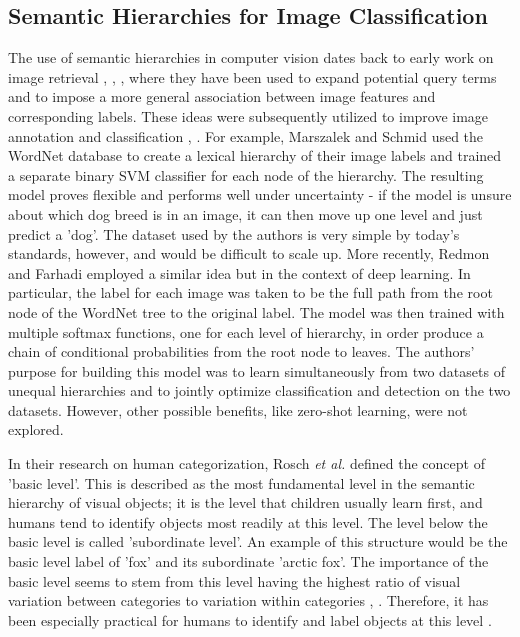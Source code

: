 \documentclass[12pt]{report}
\begin{document}
\subsection{Semantic Hierarchies for Image Classification}
The use of semantic hierarchies in computer vision dates back to early work on image retrieval \cite{Aslandogan1997}, \cite{Zhao2001}, \cite{Grosky2002} \cite{Barnard2001}, where they have been used to expand potential query terms and to impose a more general association between image features and corresponding labels. These ideas were subsequently utilized to improve image annotation and classification \cite{Srikanth2005}, \cite{Marszaek2007} \cite{Griffin2013}. For example, Marszalek and Schmid \cite{Marszaek2007} used the WordNet database \cite{Miller1995} to create a lexical hierarchy of their image labels and trained a separate binary SVM classifier \cite{Scholkopf2002} for each node of the hierarchy. The resulting model proves flexible and performs well under uncertainty - if the model is unsure about which dog breed is in an image, it can then move up one level and just predict a 'dog'. The dataset used by the authors is very simple by today's standards, however, and would be difficult to scale up. More recently, Redmon and Farhadi \cite{Redmon} employed a similar idea but in the context of deep learning. In particular, the label for each image was taken to be the full path from the root node of the WordNet tree to the original label. The model was then trained with multiple softmax functions, one for each level of hierarchy, in order produce a chain of conditional probabilities from the root node to leaves. The authors' purpose for building this model was to learn simultaneously from two datasets of unequal hierarchies and to jointly optimize classification and detection on the two datasets. However, other possible benefits, like zero-shot learning, were not explored. 

In their research on human categorization, Rosch \textit{et al.} \cite{Rosch1976} defined the concept of 'basic level'. This is described as the most fundamental level in the semantic hierarchy of visual objects; it is the level that children usually learn first, and humans tend to identify objects most readily at this level. The level below the basic level is called 'subordinate level'. An example of this structure would be the basic level label of 'fox' and its subordinate 'arctic fox'. The importance of the basic level seems to stem from this level having the highest ratio of visual variation between categories to variation within categories \cite{Rosch1976}, \cite{Joliceur1984}. Therefore, it has been especially practical for humans to identify and label objects at this level \cite{Joliceur1984}. 
\end{document}
